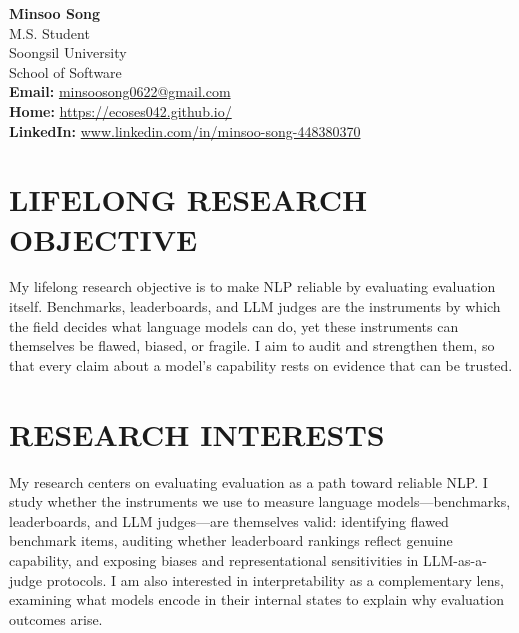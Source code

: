 \documentclass[10pt,a4paper]{article}
\newcommand{\seclabel}[1]{\section*{\uppercase{#1}}}
\begin{document}
\noindent
\begin{center}
    \textbf{\Huge{Minsoo Song}} \\ \vspace{1.0em}
    M.S. Student \\
    Soongsil University \\
    School of Software \\
    \textbf{Email: }\href{mailto:minsoosong0622@gmail.com}{minsoosong0622@gmail.com} \\
    \textbf{Home: }\href{https://ecoses042.github.io/}{https://ecoses042.github.io/} \\
    \textbf{LinkedIn: }\href{https://www.linkedin.com/in/minsoo-song-448380370}{www.linkedin.com/in/minsoo-song-448380370}
\end{center}

\vspace{1em}

\seclabel{Lifelong Research Objective}
\small{My lifelong research objective is to make NLP reliable by evaluating evaluation itself. Benchmarks,
leaderboards, and LLM judges are the instruments by which the field decides what language models can do,
yet these instruments can themselves be flawed, biased, or fragile. I aim to audit and strengthen them,
so that every claim about a model's capability rests on evidence that can be trusted.}

\seclabel{Research Interests}
\small{My research centers on evaluating evaluation as a path toward reliable NLP. I study whether the
instruments we use to measure language models---benchmarks, leaderboards, and LLM judges---are themselves
valid: identifying flawed benchmark items, auditing whether leaderboard rankings reflect genuine capability,
and exposing biases and representational sensitivities in LLM-as-a-judge protocols. I am also interested in
interpretability as a complementary lens, examining what models encode in their internal states to explain
why evaluation outcomes arise.}
\end{document}

